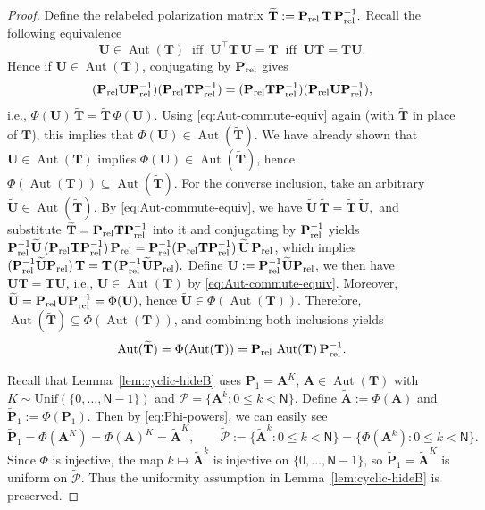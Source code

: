 \documentclass[onecolumn]{IEEEtran} %
\newcommand{\bA}{\mathbf A}
\newcommand{\bP}{\mathbf P}
\newcommand{\bU}{\mathbf U}
\newcommand{\1}{\mathbbm{1}}
\DeclareMathOperator{\Aut}{Aut}
\theoremstyle{boldremark}
\newcommand{\bT}{\mathbf{T}}
\begin{document}
\begin{proof}
Define the relabeled polarization matrix $\widetilde{\bT}:= \bP_{\rm rel}\,\bT\,\bP_{\rm rel}^{-1}.$
Recall the following equivalence
\begin{equation}\label{eq:Aut-commute-equiv}
\bU\in\Aut(\bT)
\ \mbox{ iff }\
\bU^{\top}\bT\,\bU=\bT
\ \mbox{ iff }\
\bU\bT=\bT\bU.
\end{equation}
Hence if $\bU\in\Aut(\bT)$, conjugating by $\bP_{\rm rel}$ gives
\begin{align}
     (\bP_{\rm rel}\bU\bP_{\rm rel}^{-1})(\bP_{\rm rel}\bT\bP_{\rm rel}^{-1})
     =(\bP_{\rm rel}\bT\bP_{\rm rel}^{-1})(\bP_{\rm rel}\bU\bP_{\rm rel}^{-1}),\label{EQ_Phi_R_Aut}
\end{align}
i.e., $\Phi(\bU)\,\widetilde{\bT}=\widetilde{\bT}\,\Phi(\bU)$. Using \eqref{eq:Aut-commute-equiv} again (with $\widetilde{\bT}$ in place of $\bT$),
this implies that $\Phi(\bU)\in\Aut(\widetilde{\bT}).$ We have already shown that $\bU\in\Aut(\bT)$ implies $\Phi(\bU)\in\Aut(\widetilde{\bT})$,
hence $\Phi(\Aut(\bT))\subseteq \Aut(\widetilde{\bT})$. For the converse inclusion,
take an arbitrary $\widetilde{\bU}\in\Aut(\widetilde{\bT})$. By
\eqref{eq:Aut-commute-equiv}, we have
$\widetilde{\bU}\,\widetilde{\bT}=\widetilde{\bT}\,\widetilde{\bU},$ and 
substitute $\widetilde{\bT}=\bP_{\rm rel}\bT\bP_{\rm rel}^{-1}$ into
it and conjugating by $\bP_{\rm rel}^{-1}$ yields
$\bP_{\rm rel}^{-1}\widetilde{\bU}\,(\bP_{\rm rel}\bT\bP_{\rm rel}^{-1})\,\bP_{\rm rel}
=\bP_{\rm rel}^{-1}(\bP_{\rm rel}\bT\bP_{\rm rel}^{-1})\,\widetilde{\bU}\,\bP_{\rm rel}$, which implies $
(\bP_{\rm rel}^{-1}\widetilde{\bU}\bP_{\rm rel})\,\bT
=\bT\,(\bP_{\rm rel}^{-1}\widetilde{\bU}\bP_{\rm rel}).$ Define $\bU:=\bP_{\rm rel}^{-1}\widetilde{\bU}\bP_{\rm rel}$, we then 
have $\bU\bT=\bT\bU$, i.e., $\bU\in\Aut(\bT)$ by \eqref{eq:Aut-commute-equiv}. Moreover,
$\widetilde{\bU}=\bP_{\rm rel}\bU\bP_{\rm rel}^{-1}=\Phi(\bU)$, hence
$\widetilde{\bU}\in \Phi(\Aut(\bT))$. Therefore,
$\Aut(\widetilde{\bT})\subseteq \Phi(\Aut(\bT))$, and combining both inclusions yields
\begin{equation}\label{eq:Aut-relabel}
\Aut(\widetilde{\bT})=\Phi(\Aut(\bT))=\bP_{\rm rel}\,\Aut(\bT)\,\bP_{\rm rel}^{-1}.
\end{equation}


Recall that Lemma~\ref{lem:cyclic-hideB} uses $\bP_1=\bA^K$, $\bA\in\Aut(\bT)$ with
$K\sim\mathrm{Unif}(\{0,\dots,\textsf{N}-1\})$ and
$\mathcal{P}=\{\bA^k:0\le k<\textsf{N}\}$.
Define $\widetilde{\bA}:=\Phi(\bA)$ and $\widetilde{\bP}_1:=\Phi(\bP_1)$.
Then by \eqref{eq:Phi-powers}, we can easily see
\[
\widetilde{\bP}_1=\Phi(\bA^K)=\Phi(\bA)^K=\widetilde{\bA}^K,
\qquad
\widetilde{\mathcal{P}}
:=\{\widetilde{\bA}^k:0\le k<\textsf{N}\}
=\{\Phi(\bA^k):0\le k<\textsf{N}\}.
\]
Since $\Phi$ is injective, the map $k\mapsto \widetilde{\bA}^k$ is injective on
$\{0,\dots,\textsf{N}-1\}$, so $\widetilde{\bP}_1=\widetilde{\bA}^K$ is uniform on
$\widetilde{\mathcal{P}}$. Thus the uniformity assumption in
Lemma~\ref{lem:cyclic-hideB} is preserved.


\end{proof}
\end{document}
